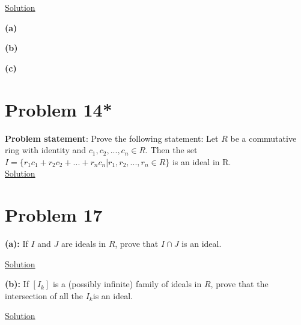 \documentclass{article} %
\begin{document}
\underline{Solution}
\begin{addmargin}[1em]{0em}
\textbf{(a)}
\begin{addmargin}[1em]{0em}

\end{addmargin}
\textbf{(b)}
\begin{addmargin}[1em]{0em}

\end{addmargin}
\textbf{(c)}
\begin{addmargin}[1em]{0em}

\end{addmargin}
\end{addmargin}

\newpage

\section*{Problem 14*}


\textbf{Problem statement}: Prove the following statement: Let $R$ be a commutative ring with identity and $c_1, c_2, ..., c_n \in R$.  Then the set $I = \{r_1c_1+r_2c_2 + ... + r_nc_n|r_1,r_2,...,r_n\in R\}$ is an ideal in R.
\\

\underline{Solution}
\begin{addmargin}[1em]{0em}

\end{addmargin}

\newpage

\section*{Problem 17}


\textbf{(a): }If $I$ and $J$ are ideals in $R$, prove that $I \cap J$ is an ideal.
\\
\begin{addmargin}[1em]{0em}
\underline{Solution}
\begin{addmargin}[1em]{0em}

\end{addmargin}
\end{addmargin}

\textbf{(b): }If $[I_k]$ is a (possibly infinite) family of ideals in $R$, prove that the intersection of all the $I_k$is an ideal.
\\
\begin{addmargin}[1em]{0em}
\underline{Solution}
\begin{addmargin}[1em]{0em}

\end{addmargin}
\end{addmargin}
\newpage
\end{document}
